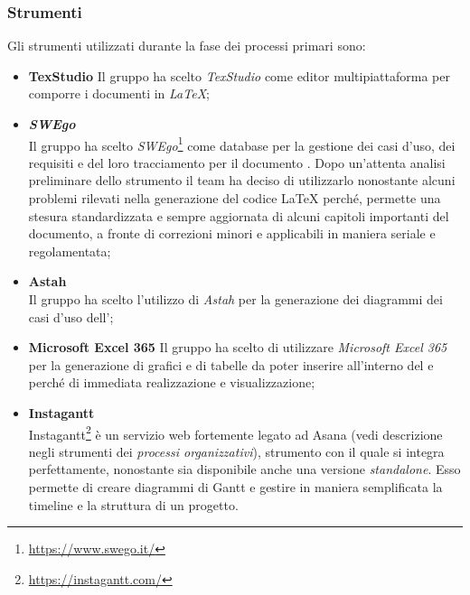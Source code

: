 \subsubsection{Strumenti}
Gli strumenti utilizzati durante la fase dei processi primari sono:
\begin{itemize}
	\item \textbf{TexStudio}
	\newline Il gruppo ha scelto \emph{TexStudio} come editor multipiattaforma per comporre i documenti in \emph{\LaTeX};
	\item \emph{\textbf{\emph{SWEgo}}}
	~\\ Il gruppo ha scelto \emph{SWEgo}\footnote{\href{https://www.swego.it/}{https://www.swego.it/}} come database per la gestione dei casi d'uso, dei requisiti e del loro tracciamento per il documento \AdR{}. Dopo un'attenta analisi preliminare dello strumento il team ha deciso di utilizzarlo nonostante alcuni problemi rilevati nella generazione del codice \LaTeX{} perché, permette una stesura standardizzata e sempre aggiornata di alcuni capitoli importanti del documento, a fronte di correzioni minori e applicabili in maniera seriale e regolamentata;
	\item \textbf{Astah}
	~\\Il gruppo ha scelto l'utilizzo di \emph{Astah} per la generazione dei diagrammi dei casi d'uso dell'\AdR{};
	\item \textbf{Microsoft Excel 365}
	\newline Il gruppo ha scelto di utilizzare \emph{Microsoft Excel 365} per la generazione di grafici e di tabelle da poter inserire all'interno del \PdQ{} e \PdP{} perché di immediata realizzazione e visualizzazione;
	
	\item \textbf{Instagantt}
	~\\Instagantt\footnote{\href{https://instagantt.com/}{https://instagantt.com/}} è un servizio web fortemente legato ad Asana (vedi descrizione negli strumenti dei \emph{processi organizzativi}), strumento con il quale si integra perfettamente, nonostante sia disponibile anche una versione \emph{standalone}. Esso permette di creare diagrammi di Gantt e gestire in maniera semplificata la timeline e la struttura di un progetto.
	
\end{itemize}	

